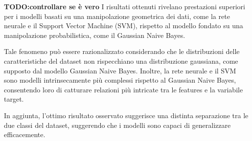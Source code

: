 \textbf{TODO:controllare se è vero}
I risultati ottenuti rivelano prestazioni superiori per i modelli basati su una
manipolazione geometrica dei dati, come la rete neurale e il Support Vector
Machine (SVM), rispetto al modello fondato su una manipolazione probabilistica,
come il Gaussian Naive Bayes.

Tale fenomeno può essere razionalizzato considerando che le distribuzioni delle
caratteristiche del dataset non rispecchiano una distribuzione gaussiana, come
supposto dal modello Gaussian Naive Bayes. Inoltre, la rete neurale e il SVM
sono modelli intrinsecamente più complessi rispetto al Gaussian Naive Bayes,
consentendo loro di catturare relazioni più intricate tra le features e
la variabile target.

In aggiunta, l'ottimo risultato osservato suggerisce una distinta separazione tra le
due classi del dataset, suggerendo che i modelli sono capaci di generalizzare
efficacemente.

